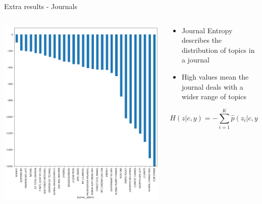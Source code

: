 \documentclass[9pt]{beamer}
\begin{document}
\begin{frame}{Extra results - Journals}

\begin{columns}
	\begin{column}{0.55\linewidth}
		\begin{center}
			\includegraphics[width=\linewidth]{../plots/journals/journal_entropy_386.png}
		\end{center}
	\end{column}
	\begin{column}{0.45\linewidth}
		\begin{center}
			\begin{itemize}
				\item Journal Entropy describes the distribution of topics in a journal \citep{Hall2008a}
				\item High values mean the journal deals with a wider range of topics
			\end{itemize}
			\[  H(z\rvert c,y) = -\sum_{i=1}^{K} \hat{p}(z_i \rvert c,y) \; log \; \hat{p}(z_i \rvert c, y) \]
		\end{center}
	\end{column}
\end{columns}

\end{frame}
\end{document}
